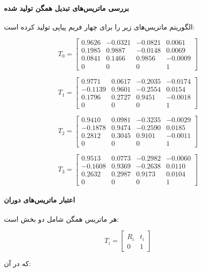 \documentclass{article}
\begin{document}
\paragraph{بررسی ماتریس‌های تبدیل همگن تولید شده}

الگوریتم ماتریس‌های زیر را برای چهار فریم پیاپی تولید کرده است:

\[
T_0 =
\begin{bmatrix}
	0.9626 & -0.0321 & -0.0821 & 0.0061 \\
	0.1985 & 0.9887 & -0.0148 & 0.0069 \\
	0.0841 & 0.1466 & 0.9856 & -0.0009 \\
	0 & 0 & 0 & 1
\end{bmatrix}
\]

\[
T_1 =
\begin{bmatrix}
	0.9771 & 0.0617 & -0.2035 & -0.0174 \\
	-0.1139 & 0.9601 & -0.2554 & 0.0154 \\
	0.1796 & 0.2727 & 0.9451 & -0.0018 \\
	0 & 0 & 0 & 1
\end{bmatrix}
\]

\[
T_2 =
\begin{bmatrix}
	0.9410 & 0.0981 & -0.3235 & -0.0029 \\
	-0.1878 & 0.9474 & -0.2590 & 0.0185 \\
	0.2812 & 0.3045 & 0.9101 & -0.0011 \\
	0 & 0 & 0 & 1
\end{bmatrix}
\]

\[
T_3 =
\begin{bmatrix}
	0.9513 & 0.0773 & -0.2982 & -0.0060 \\
	-0.1608 & 0.9369 & -0.2638 & 0.0110 \\
	0.2632 & 0.2987 & 0.9173 & 0.0104 \\
	0 & 0 & 0 & 1
\end{bmatrix}
\]

\paragraph{اعتبار ماتریس‌های دوران}

هر ماتریس همگن شامل دو بخش است:

\[
T_i = 
\begin{bmatrix}
	R_i & t_i \\
	0 & 1
\end{bmatrix}
\]

که در آن:
\end{document}
